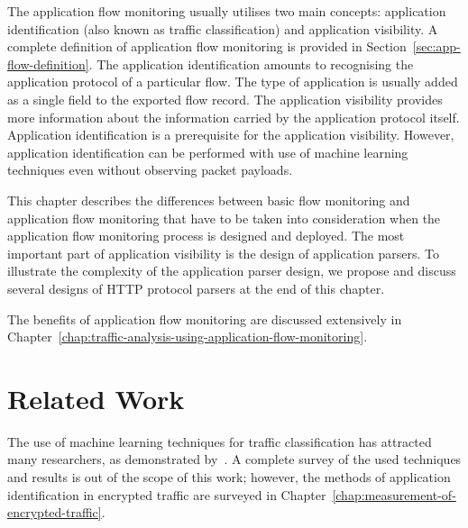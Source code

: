 The application flow monitoring usually utilises two main concepts: application identification (also known as traffic classification) and application visibility. A complete definition of application flow monitoring is provided in Section~\ref{sec:app-flow-definition}. The application identification amounts to recognising the application protocol of a particular flow. The type of application is usually added as a single field to the exported flow record. The application visibility provides more information about the information carried by the application protocol itself. Application identification is a prerequisite for the application visibility. However, application identification can be performed with use of machine learning techniques even without observing packet payloads.

This chapter describes the differences between basic flow monitoring and application flow monitoring that have to be taken into consideration when the application flow monitoring process is designed and deployed. The most important part of application visibility is the design of application parsers. To illustrate the complexity of the application parser design, we propose and discuss several designs of HTTP protocol parsers at the end of this chapter.

The benefits of application flow monitoring are discussed extensively in Chapter~\ref{chap:traffic-analysis-using-application-flow-monitoring}.

\section{Related Work}\label{sec:app-rel-work}


The use of machine learning techniques for traffic classification has attracted many researchers, as demonstrated by~\cite{Nguyen-2008-Survey, Dainotti-2012-Issues, Finsterbusch-2014-Survey}. A complete survey of the used techniques and results is out of the scope of this work; however, the methods of application identification in encrypted traffic are surveyed in Chapter~\ref{chap:measurement-of-encrypted-traffic}.


